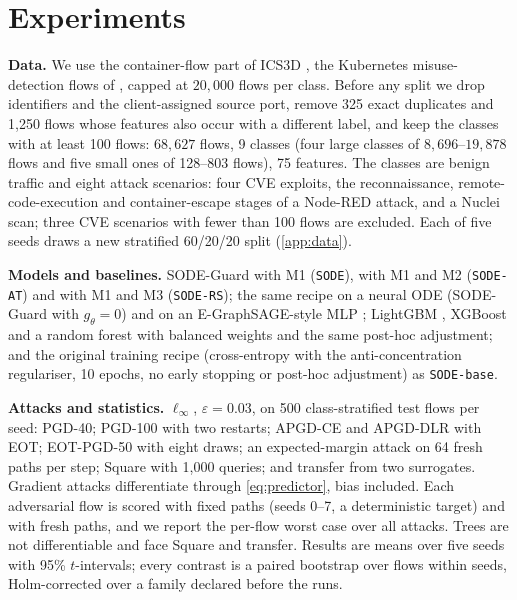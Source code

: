 \documentclass{article}
\theoremstyle{definition}
\begin{document}
\section{Experiments}\label{sec:exp}
\textbf{Data.} We use the container-flow part of ICS3D \citep{anon_ics3d}, the
Kubernetes misuse-detection flows of \citet{amin2024misuse}, capped at
$20{,}000$ flows per class. Before
any split we drop identifiers and the client-assigned source port, remove 325
exact duplicates and 1{,}250 flows whose features also occur with a different
label, and keep the classes with at least 100 flows: $68{,}627$ flows, 9 classes
(four large classes of $8{,}696$--$19{,}878$ flows and five small ones of
128--803 flows), 75 features. The classes are benign traffic and eight attack
scenarios: four CVE exploits, the reconnaissance, remote-code-execution and
container-escape stages of a Node-RED attack, and a Nuclei scan; three CVE
scenarios with fewer than 100 flows are excluded. Each of five seeds draws a new stratified
60/20/20 split (\cref{app:data}).

\textbf{Models and baselines.} SODE-Guard with M1 (\texttt{SODE}), with M1 and
M2 (\texttt{SODE-AT}) and with M1 and M3 (\texttt{SODE-RS}); the same recipe on
a neural ODE (SODE-Guard with $g_\theta=0$) and on an E-GraphSAGE-style MLP
\citep{lo2022egraphsage}; LightGBM \citep{ke2017lightgbm}, XGBoost
\citep{chen2016xgboost} and a random forest \citep{breiman2001rf} with balanced
weights and the same post-hoc adjustment; and the original training recipe
(cross-entropy with the anti-concentration regulariser, 10 epochs, no early
stopping or post-hoc adjustment) as \texttt{SODE-base}.

\textbf{Attacks and statistics.} $\ell_\infty$, $\varepsilon=0.03$, on 500
class-stratified test flows per seed: PGD-40; PGD-100 with two restarts;
APGD-CE and APGD-DLR \citep{croce2020autoattack} with EOT; EOT-PGD-50 with eight
draws; an expected-margin attack on 64 fresh paths per step; Square
\citep{andriushchenko2020square} with 1{,}000 queries; and transfer from two
surrogates. Gradient attacks differentiate through \eqref{eq:predictor}, bias
included. Each adversarial flow is scored with fixed paths (seeds 0--7, a
deterministic target) and with fresh paths, and we report the per-flow worst
case over all attacks. Trees are not differentiable and face Square and
transfer. Results are means over five seeds with 95\% $t$-intervals; every
contrast is a paired bootstrap over flows within seeds, Holm-corrected
\citep{holm1979} over a family declared before the runs.
\end{document}
